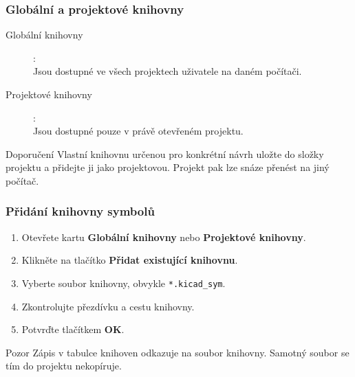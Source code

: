 \documentclass{beamer}
\begin{document}
\begin{frame}
	\frametitle{Globální a projektové knihovny}
	\begin{description}
		\item[Globální knihovny]: \\ Jsou dostupné ve všech projektech uživatele na daném počítači.
		\item[Projektové knihovny]: \\ Jsou dostupné pouze v právě otevřeném projektu.
	\end{description}

	\vfill
	\begin{block}{Doporučení}
		Vlastní knihovnu určenou pro konkrétní návrh uložte do složky projektu a přidejte ji jako projektovou. Projekt pak lze snáze přenést na jiný počítač.
	\end{block}

\end{frame}

\begin{frame}
	\frametitle{Přidání knihovny symbolů}
	\begin{enumerate}
		\item Otevřete kartu \textbf{Globální knihovny} nebo \textbf{Projektové knihovny}.
		\item Klikněte na tlačítko \textbf{Přidat existující knihovnu}.
		\item Vyberte soubor knihovny, obvykle \texttt{*.kicad\_sym}.
		\item Zkontrolujte přezdívku a cestu knihovny.
		\item Potvrďte tlačítkem \textbf{OK}.
	\end{enumerate}

	\vfill
	\begin{block}{Pozor}
		Zápis v tabulce knihoven odkazuje na soubor knihovny. Samotný soubor se tím do projektu nekopíruje.
	\end{block}

\end{frame}
\end{document}
